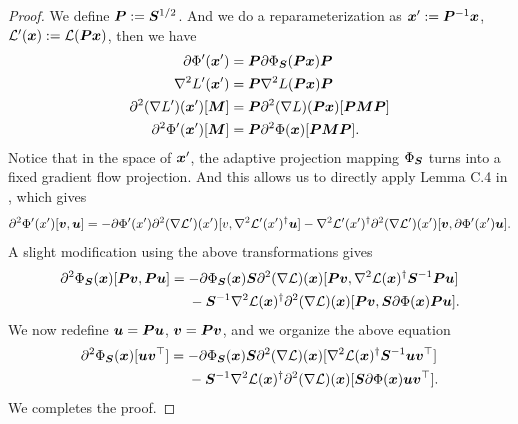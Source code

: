 \begin{proof}
    We define ${\bm{P}} := {\bm{S}}^{1/2}$. And we do a reparameterization as ${\bm{x}}' := {\bm{P}}^{-1} {\bm{x}}$, $\mathcal{L}'({\bm{x}}) := \mathcal{L}({\bm{P}}{\bm{x}})$, then we have
    \begin{align*}
        \partial \Phi'({\bm{x}}') &= {\bm{P}} \partial \Phi_{{\bm{S}}}({\bm{P}} {\bm{x}}) {\bm{P}}\\
        \nabla^2 L'({\bm{x}}') &= {\bm{P}} \nabla^2 L({\bm{P}} {\bm{x}}) {\bm{P}}\\
        \partial^2 (\nabla L')({\bm{x}}')[{\bm{M}}] &= {\bm{P}} \partial^2 (\nabla L)({\bm{P}} {\bm{x}})[{\bm{P}} {\bm{M}} {\bm{P}}]\\
         \partial^2 \Phi'({\bm{x}}') [{\bm{M}}] &= {\bm{P}} \partial^2 \Phi({\bm{x}})[{\bm{P}} {\bm{M}} {\bm{P}}].
    \end{align*}
    Notice that in the space of ${\bm{x}}'$, the adaptive projection mapping $\Phi_{{\bm{S}}}$ turns into a fixed gradient flow projection. And this allows us to directly apply Lemma C.4 in \citet{li2021happens}, which gives
    \begin{align*}
        \partial^2 \Phi'(x')[{\bm{v}},{\bm{u}}] = -\partial \Phi'(x') \partial^2(\nabla \mathcal{L}')(x')[v,\nabla^2 \mathcal{L}'(x')^{\dagger}{\bm{u}}] -  \nabla^2 \mathcal{L}'(x')^{\dagger}\partial^2(\nabla \mathcal{L}')(x')[{\bm{v}}, \partial \Phi'(x'){\bm{u}}].
    \end{align*}
    A slight modification using the above transformations gives
    \begin{align*}
        \partial^2 \Phi_{{\bm{S}}}({\bm{x}})[{\bm{P}} {\bm{v}},{\bm{P}} {\bm{u}}] &= -\partial \Phi_{{\bm{S}}}({\bm{x}}){\bm{S}} \partial^2(\nabla \mathcal{L})({\bm{x}})[{\bm{P}} {\bm{v}}, \nabla^2 \mathcal{L}({\bm{x}})^{\dagger}{\bm{S}}^{-1}{\bm{P}} {\bm{u}}] \\
        &~~~~- {\bm{S}}^{-1} \nabla^2 \mathcal{L}({\bm{x}})^{\dagger}\partial^2(\nabla \mathcal{L})({\bm{x}})[{\bm{P}} {\bm{v}},{\bm{S}} \partial \Phi({\bm{x}}){\bm{P}} {\bm{u}}].
    \end{align*}
    We now redefine ${\bm{u}} = {\bm{P}} {\bm{u}}$, ${\bm{v}} ={\bm{P}} {\bm{v}}$, and we organize the above equation
    \begin{align*}
        \partial^2 \Phi_{{\bm{S}}}({\bm{x}})[{\bm{u}}{\bm{v}}^\top] &= -\partial \Phi_{{\bm{S}}}({\bm{x}}){\bm{S}} \partial^2(\nabla \mathcal{L})({\bm{x}})[\nabla^2 \mathcal{L}({\bm{x}})^{\dagger}{\bm{S}}^{-1}{\bm{u}}{\bm{v}}^\top]\\
        &~~~~- {\bm{S}}^{-1} \nabla^2 \mathcal{L}({\bm{x}})^{\dagger}\partial^2(\nabla \mathcal{L})({\bm{x}})[{\bm{S}} \partial \Phi({\bm{x}})
    {\bm{u}}{\bm{v}}^\top].
    \end{align*}
    We completes the proof.
\end{proof}







